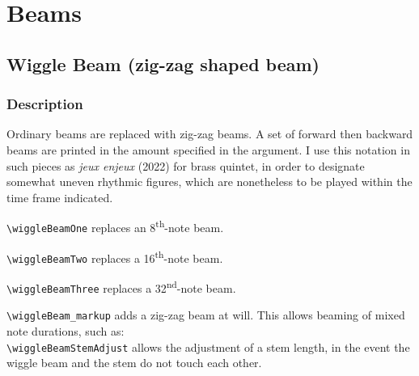\documentclass[11pt, oneside]{book}   	%
\begin{document}
\mainmatter




\chapter {Beams}

\section {Wiggle Beam (zig-zag shaped beam)}
\hfill
{}
\hfill

\subsection{Description}
Ordinary beams are replaced with zig-zag beams. A set of forward then backward beams are printed in the amount specified in the argument. I use this notation in such pieces as \textit{jeux enjeux} (2022) for brass quintet, in order to designate somewhat uneven rhythmic figures, which are nonetheless to be played within the time frame indicated. 

\verb|\wiggleBeamOne| replaces an 8\textsuperscript{th}-note beam.

\verb|\wiggleBeamTwo| replaces a 16\textsuperscript{th}-note beam.

\verb|\wiggleBeamThree| replaces a 32\textsuperscript{nd}-note beam.

\verb|\wiggleBeam_markup| adds a zig-zag beam at will. This allows beaming of mixed note durations, such as: \\
\verb|\wiggleBeamStemAdjust| allows the adjustment of a stem length, in the event the wiggle beam and the stem do not touch each other. 
\end{document}
